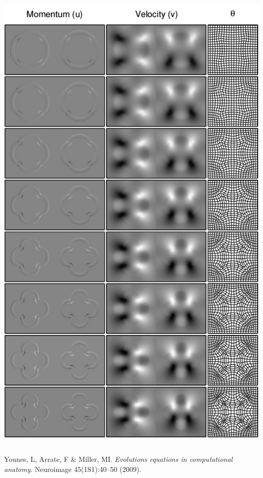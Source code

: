 \begin{frame}
\begin{columns}[c]
\begin{center}
\includegraphics[width=1\textwidth]{evolution1}
\end{center}
\end{columns}

\vspace{.25cm}
\begin{tiny}
Younes, L, Arrate, F \& Miller, MI. \emph{Evolutions equations in computational anatomy}. Neuroimage 45(1S1):40--50 (2009).\par
\end{tiny}
\end{frame}


